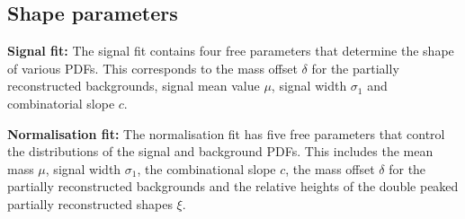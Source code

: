 \subsection{Shape parameters}
\begin{description}
\item \textbf{Signal fit:} The signal fit contains four free parameters that determine the shape of various PDFs. This corresponds to the mass offset $\delta$ for the partially reconstructed backgrounds, signal mean value $\mu$, signal width $\sigma_{1}$ and combinatorial slope $c$.
\item \textbf{Normalisation fit:} The normalisation fit has five free parameters that control the distributions of the signal and background PDFs. This includes the mean \Bp mass $\mu$, signal width $\sigma_{1}$, the combinational slope $c$, the mass offset $\delta$ for the partially reconstructed backgrounds and the relative heights of the double peaked partially reconstructed shapes $\xi$.   
\end{description}

